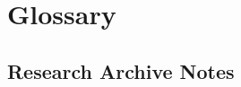 
\chapter{Glossary}
\label{vol3:app:glossary}



\section{Research Archive Notes}
\label{vol3:app:glossary:archive}



